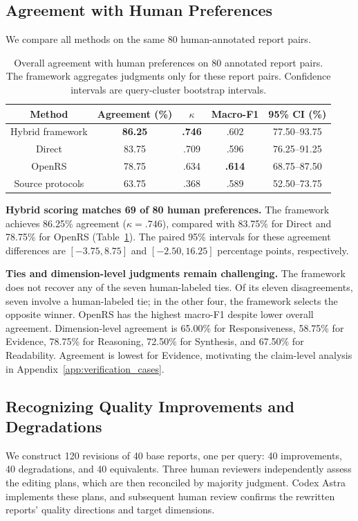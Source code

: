 \documentclass{article}
\begin{document}
\subsection{Agreement with Human Preferences}
\label{sec:human_agreement}
We compare all methods on the same 80 human-annotated report pairs.

\begin{table}[t]
\centering
\small
\setlength{\tabcolsep}{5pt}


\begin{tabular}{@{}ccccc@{}}
\toprule
Method & Agreement (\%) & $\kappa$ & Macro-F1 & 95\% CI (\%) \\
\midrule
Hybrid framework & \textbf{86.25} & \textbf{.746} & .602 & 77.50--93.75 \\
Direct & 83.75 & .709 & .596 & 76.25--91.25 \\
OpenRS & 78.75 & .634 & \textbf{.614} & 68.75--87.50 \\
Source protocols & 63.75 & .368 & .589 & 52.50--73.75 \\
\bottomrule
\end{tabular}
\caption{Overall agreement with human preferences on 80 annotated report pairs. The framework aggregates judgments only for these report pairs. Confidence intervals are query-cluster bootstrap intervals.}
\label{tab:human_agreement}
\end{table}

\textbf{Hybrid scoring matches 69 of 80 human preferences.}
The framework achieves 86.25\% agreement ($\kappa=.746$), compared with 83.75\% for Direct and 78.75\% for OpenRS (Table~\ref{tab:human_agreement}). The paired 95\% intervals for these agreement differences are $[-3.75,8.75]$ and $[-2.50,16.25]$ percentage points, respectively.

\textbf{Ties and dimension-level judgments remain challenging.}
The framework does not recover any of the seven human-labeled ties. Of its eleven disagreements, seven involve a human-labeled tie; in the other four, the framework selects the opposite winner. OpenRS has the highest macro-F1 despite lower overall agreement. Dimension-level agreement is 65.00\% for Responsiveness, 58.75\% for Evidence, 78.75\% for Reasoning, 72.50\% for Synthesis, and 67.50\% for Readability. Agreement is lowest for Evidence, motivating the claim-level analysis in Appendix~\ref{app:verification_cases}.

\subsection{Recognizing Quality Improvements and Degradations}
\label{sec:controlled_changes}
We construct 120 revisions of 40 base reports, one per query: 40 improvements, 40 degradations, and 40 equivalents. Three human reviewers independently assess the editing plans, which are then reconciled by majority judgment. Codex Astra implements these plans, and subsequent human review confirms the rewritten reports' quality directions and target dimensions.
\end{document}
